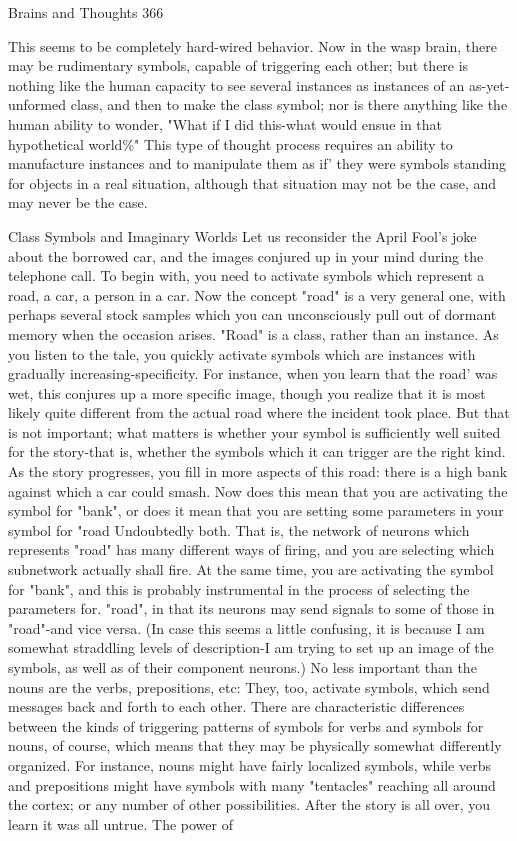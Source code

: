 Brains and Thoughts                                                                    366

This seems to be completely hard-wired behavior. Now in the wasp brain, there may be
rudimentary symbols, capable of triggering each other; but there is nothing like the
human capacity to see several instances as instances of an as-yet-unformed class, and
then to make the class symbol; nor is there anything like the human ability to wonder,
"What if I did this-what would ensue in that hypothetical world\%" This type of thought
process requires an ability to manufacture instances and to manipulate them as if' they
were symbols standing for objects in a real situation, although that situation may not be
the case, and may never be the case.

                      Class Symbols and Imaginary Worlds
Let us reconsider the April Fool's joke about the borrowed car, and the images conjured
up in your mind during the telephone call. To begin with, you need to activate symbols
which represent a road, a car, a person in a car. Now the concept "road" is a very general
one, with perhaps several stock samples which you can unconsciously pull out of
dormant memory when the occasion arises. "Road" is a class, rather than an instance. As
you listen to the tale, you quickly activate symbols which are instances with gradually
increasing-specificity. For instance, when you learn that the road' was wet, this conjures
up a more specific image, though you realize that it is most likely quite different from the
actual road where the incident took place. But that is not important; what matters is
whether your symbol is sufficiently well suited for the story-that is, whether the symbols
which it can trigger are the right kind.
As the story progresses, you fill in more aspects of this road: there is a high bank against
which a car could smash. Now does this mean that you are activating the symbol for
"bank", or does it mean that you are setting some parameters in your symbol for "road
Undoubtedly both. That is, the network of neurons which represents "road" has many
different ways of firing, and you are selecting which subnetwork actually shall fire. At
the same time, you are activating the symbol for "bank", and this is probably instrumental
in the process of selecting the parameters for. "road", in that its neurons may send signals
to some of those in "road"-and vice versa. (In case this seems a little confusing, it is
because I am somewhat straddling levels of description-I am trying to set up an image of
the symbols, as well as of their component neurons.)
No less important than the nouns are the verbs, prepositions, etc: They, too, activate
symbols, which send messages back and forth to each other. There are characteristic
differences between the kinds of triggering patterns of symbols for verbs and symbols for
nouns, of course, which means that they may be physically somewhat differently
organized. For instance, nouns might have fairly localized symbols, while verbs and
prepositions might have symbols with many "tentacles" reaching all around the cortex; or
any number of other possibilities.
After the story is all over, you learn it was all untrue. The power of




